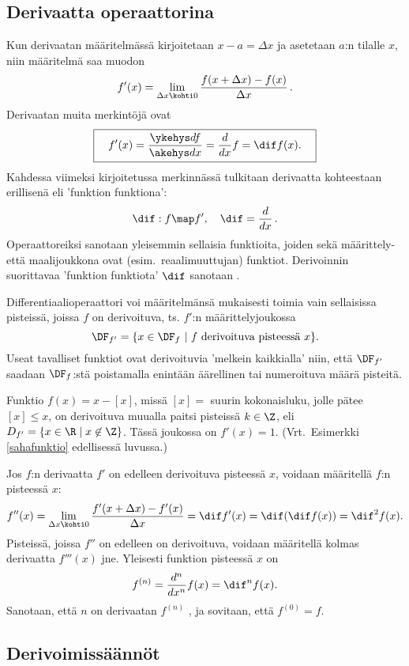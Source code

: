 \subsection*{Derivaatta operaattorina}

Kun derivaatan määritelmässä kirjoitetaan $x-a=\Delta x$ ja asetetaan $a$:n tilalle $x$, niin
määritelmä saa muodon
\[
f'(x) = \lim_{\Delta x\kohti 0} \frac{f(x+\Delta x)-f(x)}{\Delta x}\,.
\]
Derivaatan muita merkintöjä ovat
\[
\boxed{\quad f'(x)=\frac{\ykehys df}{\akehys dx}=\frac{d}{dx}f=\dif f(x). \quad}
\]
Kahdessa viimeksi kirjoitetussa merkinnässä tulkitaan derivaatta kohteestaan erillisenä
 eli 'funktion funktiona':
\[
\dif:f \map f', \quad \dif = \frac{d}{dx}\,.
\]
Operaattoreiksi sanotaan yleisemmin sellaisia funktioita, joiden sekä määrittely- että 
maalijoukkona ovat (esim.\ reaalimuuttujan) funktiot. Derivoinnin suorittavaa
'funktion funktiota' $\dif$ sanotaan
%
.

Differentiaalioperaattori voi määritelmänsä mukaisesti toimia vain sellaisissa pisteissä,
joissa $f$ on derivoituva, ts. $f'$:n määrittelyjoukossa
\[
\DF_{f'}=\{x\in\DF_f \ | \ f \text{ derivoituva pisteessä } x\}.
\]
Useat tavalliset funktiot ovat derivoituvia 'melkein kaikkialla' niin, että $\DF_{f'}$
saadaan $\DF_f$:stä poistamalla enintään äärellinen tai numeroituva määrä pisteitä. 
\begin{Exa} Funktio $f(x)=x-[x]$, missä $[x]=$ suurin kokonaisluku, jolle pätee $[x] \le x$,
on derivoituva muualla paitsi pisteissä $k \in \Z$, eli $D_{f'}=\{x\in\R \mid x\not\in\Z\}$. 
Tässä joukossa on $f'(x)=1$. (Vrt.\ Esimerkki \ref{sahafunktio} edellisessä luvussa.) \loppu
\end{Exa}

Jos $f$:n derivaatta $f'$ on edelleen derivoituva pisteessä $x$, voidaan määritellä $f$:n 
 pisteessä $x$:
\[
f''(x)=\lim_{\Delta x\kohti 0} \frac{f'(x+\Delta x)-f'(x)}{\Delta x} = \dif f'(x)
      = \dif(\dif f(x)) = \dif^2 f(x).
\]
Pisteissä, joissa $f''$ on edelleen on derivoituva, voidaan määritellä kolmas derivaatta
$f'''(x)$ jne. Yleisesti funktion  pisteessä $x$ on
\[
f^{(n)}=\frac{d^n}{dx^n}f(x)=\dif^n f(x).
\]
%
Sanotaan, että $n$ on derivaatan $f^{(n)}$ , ja sovitaan, että $f^{(0)}=f$.

\subsection*{Derivoimissäännöt}

